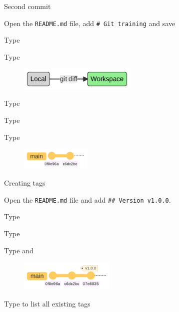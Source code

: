 \documentclass[10pt]{beamer}
\begin{document}
\begin{frame}[fragile]{Second commit}
\protect\hypertarget{second-commit}{}

Open the \texttt{README.md} file, add \texttt{\#\ Git\ training} and
save

Type 

Type 

\begin{figure}[H]

{\centering \includegraphics[width=0.5\textwidth]{mermaid/mermaid-figure-23.png}

}

\end{figure}

Type 

Type 

Type 

\begin{figure}[H]

{\centering \includegraphics[width=0.3\textwidth]{mermaid/mermaid-figure-22.png}

}

\end{figure}
\end{frame}

\begin{frame}[fragile]{Creating tags}
\protect\hypertarget{creating-tags}{}

Open the \texttt{README.md} file and add
\texttt{\#\#\ Version\ v1.0.0}.

Type 

Type 

Type  and 

\begin{figure}[H]

{\centering \includegraphics[width=0.4\textwidth]{mermaid/mermaid-figure-21.png}

}

\end{figure}

Type  to list all existing tags
\end{frame}
\end{document}

